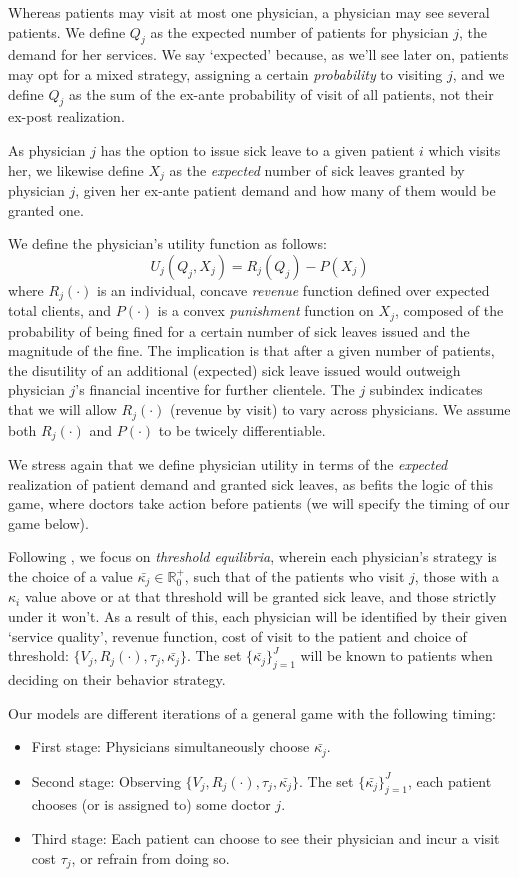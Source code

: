 \documentclass[../main.tex]{subfiles}
\begin{document}
Whereas patients may visit at most one physician, a physician may see several patients. We define $Q_j$ as the expected number of patients for physician $j$, the demand for her services. We say `expected' because, as we'll see later on, patients may opt for a mixed strategy, assigning a certain \textit{probability} to visiting $j$, and we define $Q_j$ as the sum of the ex-ante probability of visit of all patients, not their ex-post realization.

As physician $j$ has the option to issue sick leave to a given patient $i$ which visits her, we likewise define $X_j$ as the \textit{expected} number of sick leaves granted by physician $j$, given her ex-ante patient demand and how many of them would be granted one.

We define the physician's utility function as follows:
\[
U_j(Q_j, X_j) = R_j(Q_j) - P(X_j)
\]
where $R_j(\cdot)$ is an individual, concave \textit{revenue} function defined over expected total clients, and $P(\cdot)$ is a convex \textit{punishment} function on $X_j$, composed of the probability of being fined for a certain number of sick leaves issued and the magnitude of the fine. The implication is that after a given number of patients, the disutility of an additional (expected) sick leave issued would outweigh physician $j$'s financial incentive for further clientele. The $j$ subindex indicates that we will allow $R_j(\cdot)$ (revenue by visit) to vary across physicians. We assume both $R_j(\cdot)$ and $P(\cdot)$ to be twicely differentiable.

We stress again that we define physician utility in terms of the \textit{expected} realization of patient demand and granted sick leaves, as befits the logic of this game, where doctors take action before patients (we will specify the timing of our game below).

Following \cite{schnell2017physician}, we focus on \textit{threshold equilibria}, wherein each physician's strategy is the choice of a value $\bar{\kappa_j} \in \mathbb{R}_0^+$, such that of the patients who visit $j$, those with a $\kappa_i$ value above or at that threshold will be granted sick leave, and those strictly under it won't. As a result of this, each physician will be identified by their given `service quality', revenue function, cost of visit to the patient and choice of threshold: $\{V_j,R_j(\cdot), \tau_j, \bar{\kappa_j}\}$. The set $\{\bar{\kappa_j}\}_{j=1}^{J}$ will be known to patients when deciding on their behavior strategy.

Our models are different iterations of a general game with the following timing:
\begin{itemize}[itemsep=-1pt, topsep=0pt]
    \item First stage: Physicians simultaneously choose $\bar{\kappa_j}$.
    \item Second stage: Observing $\{V_j,R_j(\cdot), \tau_j, \bar{\kappa_j}\}$. The set $\{\bar{\kappa_j}\}_{j=1}^{J}$, each patient chooses (or is assigned to) some doctor $j$.
    \item Third stage: Each patient can choose to see their physician and incur a visit cost $\tau_j$, or refrain from doing so.
\end{itemize}
\end{document}
